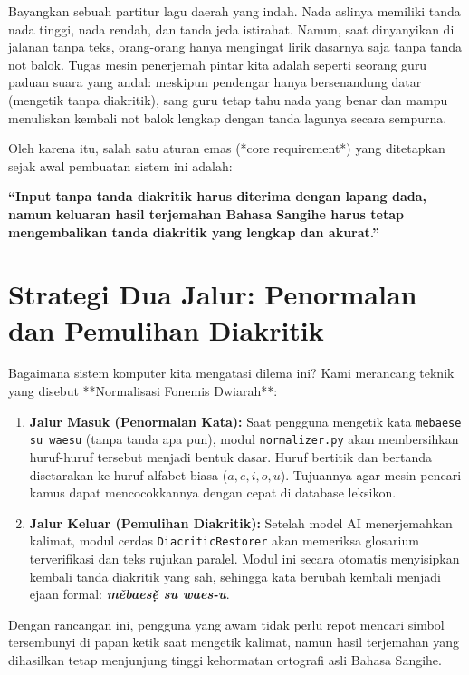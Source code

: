\begin{infobox}
Bayangkan sebuah partitur lagu daerah yang indah. Nada aslinya memiliki tanda nada tinggi, nada rendah, dan tanda jeda istirahat. Namun, saat dinyanyikan di jalanan tanpa teks, orang-orang hanya mengingat lirik dasarnya saja tanpa tanda not balok. Tugas mesin penerjemah pintar kita adalah seperti seorang guru paduan suara yang andal: meskipun pendengar hanya bersenandung datar (mengetik tanpa diakritik), sang guru tetap tahu nada yang benar dan mampu menuliskan kembali not balok lengkap dengan tanda lagunya secara sempurna.
\end{infobox}

Oleh karena itu, salah satu aturan emas (*core requirement*) yang ditetapkan sejak awal pembuatan sistem ini adalah:
\begin{center}
\textbf{“Input tanpa tanda diakritik harus diterima dengan lapang dada, namun keluaran hasil terjemahan Bahasa Sangihe harus tetap mengembalikan tanda diakritik yang lengkap dan akurat.”}
\end{center}

\section{Strategi Dua Jalur: Penormalan dan Pemulihan Diakritik}
Bagaimana sistem komputer kita mengatasi dilema ini? Kami merancang teknik yang disebut **Normalisasi Fonemis Dwiarah**:

\begin{enumerate}
    \item \textbf{Jalur Masuk (Penormalan Kata):} Saat pengguna mengetik kata \texttt{mebaese su waesu} (tanpa tanda apa pun), modul \texttt{normalizer.py} akan membersihkan huruf-huruf tersebut menjadi bentuk dasar. Huruf bertitik dan bertanda disetarakan ke huruf alfabet biasa ($a, e, i, o, u$). Tujuannya agar mesin pencari kamus dapat mencocokkannya dengan cepat di database leksikon.
    \item \textbf{Jalur Keluar (Pemulihan Diakritik):} Setelah model AI menerjemahkan kalimat, modul cerdas \texttt{DiacriticRestorer} akan memeriksa glosarium terverifikasi dan teks rujukan paralel. Modul ini secara otomatis menyisipkan kembali tanda diakritik yang sah, sehingga kata berubah kembali menjadi ejaan formal: \textbf{\textit{měbaes\d{e}\v{} su waes-u}}.
\end{enumerate}

Dengan rancangan ini, pengguna yang awam tidak perlu repot mencari simbol tersembunyi di papan ketik saat mengetik kalimat, namun hasil terjemahan yang dihasilkan tetap menjunjung tinggi kehormatan ortografi asli Bahasa Sangihe.
